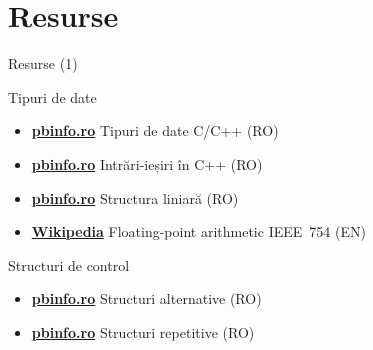 \documentclass{beamer}
\begin{document}
\section{Resurse}

\begin{frame}{Resurse (1)}
  \begin{block}{Tipuri de date}
    \begin{itemize}\footnotesize\itemsep0pt
      \item \href{https://www.pbinfo.ro/articole/58/tipuri-de-date-c-c}{\textbf{pbinfo.ro}} \textemdash{} Tipuri de date C/C++ (RO)
      \item \href{https://www.pbinfo.ro/articole/60/intrari-iesiri-in-cpp}{\textbf{pbinfo.ro}} \textemdash{} Intrări-ieșiri în C++ (RO)
      \item \href{https://www.pbinfo.ro/articole/68/structura-liniara}{\textbf{pbinfo.ro}} \textemdash{} Structura liniară (RO)
      \item \href{https://en.wikipedia.org/wiki/Floating-point_arithmetic\#IEEE_754:_floating_point_in_modern_computers}{\textbf{Wikipedia}} \textemdash{} Floating-point arithmetic \textemdash{} IEEE~754 (EN)
    \end{itemize}
  \end{block}
  \vspace{-6pt}
  \begin{block}{Structuri de control}
    \begin{itemize}\footnotesize\itemsep0pt
      \item \href{https://www.pbinfo.ro/articole/70/structuri-alternative}{\textbf{pbinfo.ro}} \textemdash{} Structuri alternative (RO)
      \item \href{https://www.pbinfo.ro/articole/71/structuri-repetitive}{\textbf{pbinfo.ro}} \textemdash{} Structuri repetitive (RO)
    \end{itemize}
  \end{block}
\end{frame}
\end{document}
